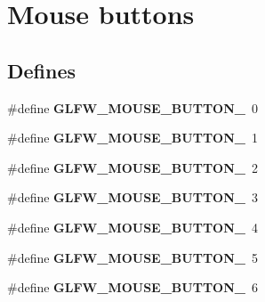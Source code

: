 \hypertarget{group__buttons}{\section{\-Mouse buttons}
\label{group__buttons}
}
\subsection*{\-Defines}
\begin{DoxyCompactItemize}
\item 
\hypertarget{group__buttons_ga181a6e875251fd8671654eff00f9112e}{\#define {\bfseries \-G\-L\-F\-W\-\_\-\-M\-O\-U\-S\-E\-\_\-\-B\-U\-T\-T\-O\-N\-\_}~0}\label{group__buttons_ga181a6e875251fd8671654eff00f9112e}

\item 
\hypertarget{group__buttons_ga604b39b92c88ce9bd332e97fc3f4156c}{\#define {\bfseries \-G\-L\-F\-W\-\_\-\-M\-O\-U\-S\-E\-\_\-\-B\-U\-T\-T\-O\-N\-\_}~1}\label{group__buttons_ga604b39b92c88ce9bd332e97fc3f4156c}

\item 
\hypertarget{group__buttons_ga0130d505563d0236a6f85545f19e1721}{\#define {\bfseries \-G\-L\-F\-W\-\_\-\-M\-O\-U\-S\-E\-\_\-\-B\-U\-T\-T\-O\-N\-\_}~2}\label{group__buttons_ga0130d505563d0236a6f85545f19e1721}

\item 
\hypertarget{group__buttons_ga53f4097bb01d5521c7d9513418c91ca9}{\#define {\bfseries \-G\-L\-F\-W\-\_\-\-M\-O\-U\-S\-E\-\_\-\-B\-U\-T\-T\-O\-N\-\_}~3}\label{group__buttons_ga53f4097bb01d5521c7d9513418c91ca9}

\item 
\hypertarget{group__buttons_gaf08c4ddecb051d3d9667db1d5e417c9c}{\#define {\bfseries \-G\-L\-F\-W\-\_\-\-M\-O\-U\-S\-E\-\_\-\-B\-U\-T\-T\-O\-N\-\_}~4}\label{group__buttons_gaf08c4ddecb051d3d9667db1d5e417c9c}

\item 
\hypertarget{group__buttons_gae8513e06aab8aa393b595f22c6d8257a}{\#define {\bfseries \-G\-L\-F\-W\-\_\-\-M\-O\-U\-S\-E\-\_\-\-B\-U\-T\-T\-O\-N\-\_}~5}\label{group__buttons_gae8513e06aab8aa393b595f22c6d8257a}

\item 
\hypertarget{group__buttons_ga8b02a1ab55dde45b3a3883d54ffd7dc7}{\#define {\bfseries \-G\-L\-F\-W\-\_\-\-M\-O\-U\-S\-E\-\_\-\-B\-U\-T\-T\-O\-N\-\_}~6}\label{group__buttons_ga8b02a1ab55dde45b3a3883d54ffd7dc7}


\end{DoxyCompactItemize}
